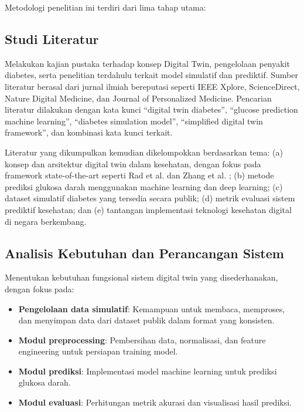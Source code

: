 \documentclass[12pt,a4paper,oneside]{book}
\begin{document}
Metodologi penelitian ini terdiri dari lima tahap utama:

\subsection{Studi Literatur}

Melakukan kajian pustaka terhadap konsep Digital Twin, pengelolaan penyakit diabetes, serta penelitian terdahulu terkait model simulatif dan prediktif. Sumber literatur berasal dari jurnal ilmiah bereputasi seperti IEEE Xplore, ScienceDirect, Nature Digital Medicine, dan Journal of Personalized Medicine. Pencarian literatur dilakukan dengan kata kunci ``digital twin diabetes'', ``glucose prediction machine learning'', ``diabetes simulation model'', ``simplified digital twin framework'', dan kombinasi kata kunci terkait.

Literatur yang dikumpulkan kemudian dikelompokkan berdasarkan tema: (a) konsep dan arsitektur digital twin dalam kesehatan, dengan fokus pada framework state-of-the-art seperti Rad et al. \autocite{Rad2024} dan Zhang et al. \autocite{Zhang2024}; (b) metode prediksi glukosa darah menggunakan machine learning dan deep learning; (c) dataset simulatif diabetes yang tersedia secara publik; (d) metrik evaluasi sistem prediktif kesehatan; dan (e) tantangan implementasi teknologi kesehatan digital di negara berkembang.

\subsection{Analisis Kebutuhan dan Perancangan Sistem}

Menentukan kebutuhan fungsional sistem digital twin yang disederhanakan, dengan fokus pada:

\begin{itemize}
    \item \textbf{Pengelolaan data simulatif}: Kemampuan untuk membaca, memproses, dan menyimpan data dari dataset publik dalam format yang konsisten.
    \item \textbf{Modul preprocessing}: Pembersihan data, normalisasi, dan feature engineering untuk persiapan training model.
    \item \textbf{Modul prediksi}: Implementasi model machine learning untuk prediksi glukosa darah.
    \item \textbf{Modul evaluasi}: Perhitungan metrik akurasi dan visualisasi hasil prediksi.
\end{itemize}
\end{document}
